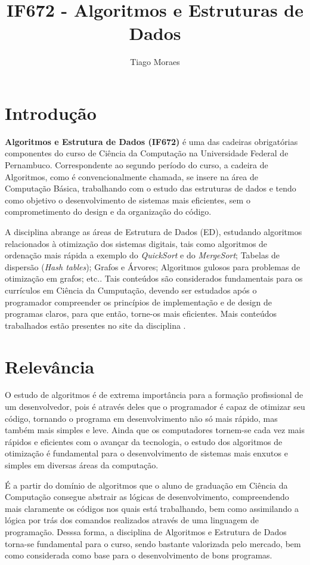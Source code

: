 \documentclass[a4paper]{article}
\title{IF672 - Algoritmos e Estruturas de Dados}
\author{Tiago Moraes}
\begin{document}
\maketitle

\section{Introdução}
\textbf{Algoritmos e Estrutura de Dados (IF672)} é uma das cadeiras obrigatórias componentes do curso de Ciência da Computação na Universidade Federal de Pernambuco. Correspondente ao segundo período do curso, a cadeira de Algoritmos, como é convencionalmente chamada, se insere na área de Computação Básica, trabalhando com o estudo das estruturas de dados e tendo como objetivo o desenvolvimento de sistemas mais eficientes, sem o comprometimento do design e da organização do código.

A disciplina abrange as áreas de Estrutura de Dados (ED), estudando algoritmos relacionados à otimização dos sistemas digitais, tais como algoritmos de ordenação mais rápida a exemplo do \textit{QuickSort} e do \textit{MergeSort}; Tabelas de dispersão (\textit{Hash tables}); Grafos e Árvores; Algoritmos gulosos para problemas de otimização em grafos; etc.. Tais conteúdos são considerados fundamentais para os currículos em Ciência da Cumputação, devendo ser estudados após o programador compreender os princípios de implementação e de design de programas claros, para que então, torne-os mais eficientes. Mais conteúdos trabalhados estão presentes no site da disciplina \cite{site}.

\section{Relevância}
O estudo de algoritmos é de extrema importância para a formação profissional de um desenvolvedor, pois é através deles que o programador é capaz de otimizar seu código, tornando o programa em desenvolvimento não só mais rápido, mas também mais simples e leve. Ainda que os computadores tornem-se cada vez mais rápidos e eficientes com o avançar da tecnologia, o estudo dos algoritmos de otimização é fundamental para o desenvolvimento de sistemas mais enxutos e simples em diversas áreas da computação. \cite{wiki}

É a partir do domínio de algoritmos que o aluno de graduação em Ciência da Computação consegue abstrair as lógicas de desenvolvimento, compreendendo mais claramente os códigos nos quais está trabalhando, bem como assimilando a lógica por trás dos comandos realizados através de uma linguagem de programação. Desssa forma, a disciplina de Algoritmos e Estrutura de Dados torna-se fundamental para o curso, sendo bastante valorizada pelo mercado, bem como considerada como base para o desenvolvimento de bons programas.
\end{document}
